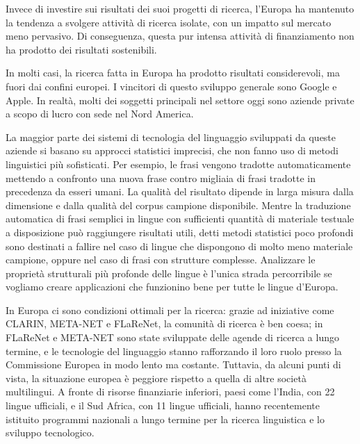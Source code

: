 \begin{multicols}{2}

Invece di investire sui risultati dei suoi progetti di ricerca, l'Europa ha mantenuto la tendenza a svolgere attivit\`{a} di ricerca isolate, con un impatto sul mercato meno pervasivo. Di conseguenza, questa pur intensa attivit\`{a} di finanziamento non ha prodotto dei risultati sostenibili.


In molti casi, la ricerca fatta in Europa ha prodotto risultati considerevoli, ma fuori dai confini europei. I vincitori di questo sviluppo generale sono Google e Apple. In realt\`{a}, molti dei soggetti principali nel settore oggi sono aziende private a scopo di lucro con sede nel Nord America.

La maggior parte dei sistemi di tecnologia del linguaggio sviluppati da queste aziende si basano su approcci statistici imprecisi, che non fanno uso di metodi linguistici pi\`{u} sofisticati. Per esempio, le frasi vengono tradotte automaticamente mettendo a confronto una nuova frase contro migliaia di frasi tradotte in precedenza da esseri umani. La qualit\`{a} del risultato dipende in larga misura dalla dimensione e dalla qualit\`{a} del corpus campione disponibile. Mentre la traduzione automatica di frasi semplici in lingue con sufficienti quantit\`{a} di materiale testuale a disposizione pu\`{o} raggiungere risultati utili, detti metodi statistici poco profondi sono destinati a fallire nel caso di lingue che dispongono di molto meno materiale campione, oppure nel caso di frasi con strutture complesse. Analizzare le propriet\`{a} strutturali pi\`{u} profonde delle lingue \`{e} l'unica strada percorribile se vogliamo creare applicazioni che funzionino bene per tutte le lingue d'Europa.


In Europa ci sono condizioni ottimali per la ricerca: grazie ad iniziative come CLARIN, META-NET e FLaReNet, la comunit\`{a} di ricerca \`{e} ben coesa; in FLaReNet e META-NET sono state sviluppate delle agende di ricerca a lungo termine, e le tecnologie del linguaggio stanno rafforzando il loro ruolo presso la Commissione Europea in modo lento ma costante. 
Tuttavia, da alcuni punti di vista, la situazione europea \`{e} peggiore rispetto a quella di altre societ\`{a} multilingui. A fronte di risorse finanziarie inferiori, paesi come l'India, con 22 lingue ufficiali, e il Sud Africa, con 11 lingue ufficiali, hanno recentemente istituito programmi nazionali a lungo termine per la ricerca linguistica e lo sviluppo tecnologico.


\end{multicols}
